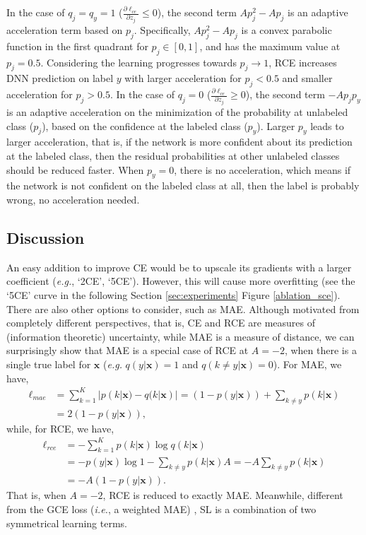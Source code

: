 \documentclass[10pt,twocolumn,letterpaper]{article}
\def \xx {\mathbf{x}}
\begin{document}
In the case of $q_j = q_y = 1$ ($\frac{\partial \ell_{ce}}{\partial z_j} \leq 0$), the second term $Ap^{2}_{j} - Ap_j$ is an adaptive acceleration term based on $p_j$. Specifically, $Ap^{2}_{j} - Ap_j$ is a convex parabolic function in the first quadrant for $p_j \in [0, 1]$, and has the maximum value at $p_j=0.5$. Considering the learning progresses towards $p_j \to 1$, RCE increases DNN prediction on label $y$ with larger acceleration for $p_j < 0.5$ and smaller acceleration for $p_j > 0.5$. In the case of $q_j = 0$ ($\frac{\partial \ell_{ce}}{\partial z_j} \geq 0$), the second term $-Ap_{j}p_{y}$ is an adaptive acceleration on the minimization of the probability at unlabeled class ($p_j$), based on the confidence at the labeled class ($p_y$). Larger $p_y$ leads to larger acceleration, that is, if the network is more confident about its prediction at the labeled class, then the residual probabilities at other unlabeled classes should be reduced faster. When $p_y=0$, there is no acceleration, which means if the network is not confident on the labeled class at all, then the label is probably wrong, no acceleration needed.

\subsection{Discussion}\label{sec:discuss}
An easy addition to improve CE would be to upscale its gradients with a larger coefficient (\textit{e.g.}, `2CE', `5CE'). However, this will cause more overfitting (see the `5CE' curve in the following Section \ref{sec:experiments} Figure \ref{ablation_sce}). There are also other options to consider, such as MAE. Although motivated from completely different perspectives, that is, CE and RCE are measures of (information theoretic) uncertainty, while MAE is a measure of distance, we can surprisingly show that MAE is a special case of RCE at $A=-2$, when there is a single true label for $\xx$ (\textit{e.g.} $q(y|\xx)=1$ and $q(k\neq y|\xx)=0$). For MAE, we have,
\begin{equation*}
    \begin{split}
        \ell_{mae} &= \sum_{k=1}^{K} |p(k|\xx) - q(k|\xx)|
         = (1-p(y|\xx)) + \sum_{k \neq y} p(k|\xx) \\
        & = 2(1-p(y|\xx)),
    \end{split}
\end{equation*}
while, for RCE, we have,
\begin{equation*}
    \begin{split}
        \ell_{rce} &= -\sum_{k=1}^{K} p(k|\xx) \log q(k|\xx) \\
        & = -p(y|\xx)\log1 - \sum_{k \neq y} p(k|\xx)A 
        = -A\sum_{k \neq y} p(k|\xx) \\
        & = -A(1-p(y|\xx)).
    \end{split}
    \label{MAE-RCE}
\end{equation*}
That is, when $A=-2$, RCE is reduced to exactly MAE. Meanwhile, different from the GCE loss (\textit{i.e.}, a weighted MAE) \cite{zhang2018generalized},  SL is a combination of two symmetrical learning terms. 
\end{document}
